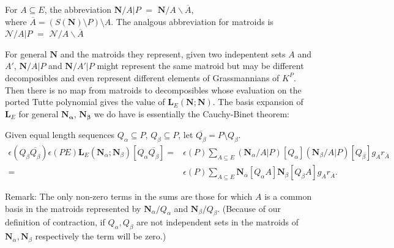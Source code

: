 \documentclass[Unicode]{cedram-alco}
\newcommand{\ext}[1]{\ensuremath{\mathbf{#1}}}
\newcommand{\eNal}{\ensuremath{\ext{N}_{\alpha}}}
\newcommand{\eNbe}{\ensuremath{\ext{N}_\beta}}
\newcommand{\extLHorSub}[3]{\ext{L}_{#1}\left(  {#2}; {#3}  \right)}
\begin{document}
\begin{defi}\label{NcontrArestrictP}
For $A\subseteq E$, the abbreviation $\ext{N}/A|P$ $=$
$\ext{N}/A\backslash \overline{A}$, \\
where $\overline{A}=(S(\ext{N})\setminus P)\setminus A$.  The analgous
abbreviation for matroids is \\
$\mathcal{N}/A|P$ $=$
$\mathcal{N}/A\backslash \overline{A}$
\end{defi}

For general $\ext{N}$ and the matroids they represent, given two indepentent sets $A$ and $A'$,
$\ext{N}/A|P$ and $\ext{N}/A'|P$ might represent the same matroid but may be
different decomposibles and even represent different elements of Grassmannians of $K^{P}$.
Then there is no map from matroids to decomposibles whose evaluation on the ported
Tutte polynomial gives the value of $\ext{L}_E( \ext{N} ; \ext{N} )$.  The basis
expansion of $\ext{L}_E$ for general $\ext{N_\alpha}$, $\ext{N_\beta}$ we do have is
essentially the Cauchy-Binet theorem:



\begin{coro} Given 
  equal length sequences $Q_\alpha \subseteq P$, $Q_\beta \subseteq P$,
  let $\overline{Q_\beta}=P\setminus Q_\beta$.
\label{common-basis-expansion}
\begin{equation}
  \begin{split}
    \epsilon(  Q_\beta \overline{Q_\beta} )\epsilon(PE)
    \extLHorSub{E}{\eNal}{\eNbe}  [Q_{\alpha}\overline{Q_{\beta}}]
    =& 
    \epsilon(P)\sum_{A\subseteq E}
    (\ext{N}_\alpha/A|P) [Q_\alpha]
    (\ext{N}_\beta/A|P) [Q_\beta] g_Ar_{\overline{A}} \\
    =& 
    \epsilon(P)\sum_{A\subseteq E}
    \ext{N}_\alpha[Q_\alpha A]
    \ext{N}_\beta [Q_\beta A]
    g_Ar_{\overline{A}}.
  \end{split}
\end{equation}

\end{coro}
Remark: The only non-zero terms in the sums are those for which $A$ is a common
basis in the matroids represented by $\ext{N}_\alpha/Q_\alpha$ and $\ext{N}_\beta/Q_\beta$.
(Because of our definition of contraction,
if $Q_\alpha, Q_\beta$ are not independent sets in the matroids of $\ext{N}_\alpha, \ext{N}_\beta$
respectively the term will be zero.)
\end{document}
